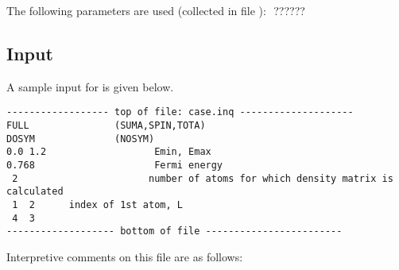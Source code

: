 The following parameters are used (collected in file ):
$$  ??????

\subsection{Input}
\label{sec:qtl-in}

A sample input for  is given below.

{\scriptsize
\begin{verbatim}
------------------ top of file: case.inq --------------------
FULL               (SUMA,SPIN,TOTA)
DOSYM              (NOSYM)
0.0 1.2                   Emin, Emax
0.768                     Fermi energy 
 2                       number of atoms for which density matrix is calculated
 1  2      index of 1st atom, L
 4  3
------------------- bottom of file ------------------------
\end{verbatim}
}

Interpretive comments on this file are as follows:

